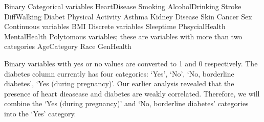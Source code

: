\documentclass[letterpaper,10pt,english]{jupyterBook}
\begin{document}
\begin{sphinxVerbatim}[commandchars=\\\{\}]
\PYGZhy{} Binary Categorical variables
  \PYGZhy{}  HeartDisease
  \PYGZhy{}  Smoking 
  \PYGZhy{}  AlcoholDrinking
  \PYGZhy{}  Stroke 
  \PYGZhy{}  DiffWalking
  \PYGZhy{}  Diabet   
  \PYGZhy{}  Physical Activity
  \PYGZhy{}  Asthma
  \PYGZhy{}  Kidney Disease
  \PYGZhy{}  Skin Cancer
  \PYGZhy{}  Sex
\PYGZhy{} Continuous variables
  \PYGZhy{} BMI
\PYGZhy{} Discrete variables
  \PYGZhy{} Sleeptime
  \PYGZhy{} PhsycialHealth
  \PYGZhy{} MentalHealth
\PYGZhy{} Polytomous variables; these are variables with more than two categories
  \PYGZhy{} AgeCategory
  \PYGZhy{} Race 
  \PYGZhy{} GenHealth
\end{sphinxVerbatim}

\sphinxAtStartPar
Binary variables with yes or no values are converted to 1 and 0 respectively. The diabetes column currently has four categories: ‘Yes’, ‘No’, ‘No, borderline diabetes’, ‘Yes (during pregnancy)’. Our earlier analysis revealed that  the presence of heart dieasease and diabetes are weakly correlated. Therefore, we will combine the ‘Yes (during pregnancy)’ and ‘No, borderline diabetes’ categories into the ‘Yes’ category.
\end{document}

